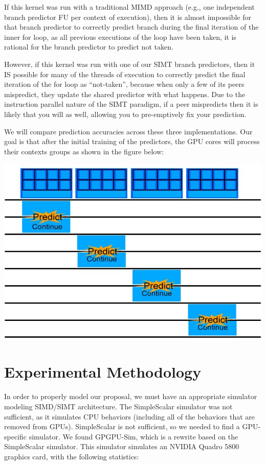 \documentclass[conference]{IEEEtran}
\begin{document}
If this kernel was run with a traditional MIMD approach (e.g., one independent branch predictor FU per context of execution), then it is almost
impossible for that branch predictor to correctly predict branch during the final iteration of the inner for loop, as all previous executions of the loop
have been taken, it is rational for the branch predictor to predict not taken.

However, if this kernel was run with one of our SIMT branch predictors, then it IS possible for many of the threads of execution to correctly predict the final iteration
of the for loop as ``not-taken'', because when only a few of its peers mispredict, they update the shared predictor with what happens.  Due to the instruction parallel nature of the 
SIMT paradigm, if a peer mispredicts then it is likely that you will as well, allowing you to pre-emptively fix your prediction.

We will compare prediction accuracies across these three implementations.  Our goal is that after the initial training of the predictors, the GPU cores will process their contexts groups as shown in the figure below:

\begin{center}
	\includegraphics[width=.45\textwidth]{GPU-predict-context.jpg}
\end{center}

\section{Experimental Methodology}

In order to properly model our proposal, we must have an appropriate simulator modeling SIMD/SIMT architecture.  The SimpleScalar simulator was not sufficient, as it simulates CPU behaviors (including all of the behaviors that are removed from GPUs).  SimpleScalar is not sufficient, so we needed to find a GPU-specific simulator.  We found GPGPU-Sim, which is a rewrite based on the SimpleScalar simulator.  This simulator simulates an NVIDIA Quadro 5800 graphics card, with the following statistics:
\end{document}
